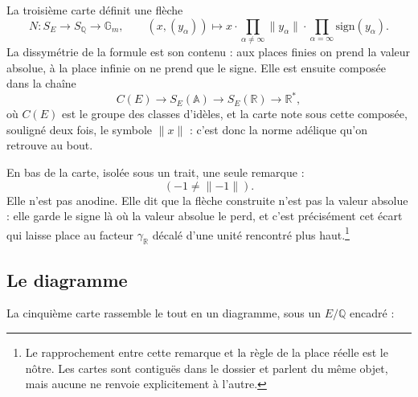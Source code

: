 \documentclass[11pt,a4paper]{article}
\begin{document}
La troisième carte définit une flèche
\[
N : S_{E} \longrightarrow S_{\mathbb{Q}} \longrightarrow \mathbb{G}_{m},
\qquad
(x, (y_{\alpha})) \longmapsto x \cdot \prod_{\alpha \neq \infty}
\lVert y_{\alpha}\rVert \cdot \prod_{\alpha = \infty}
\mathrm{sign}(y_{\alpha}) .
\]
La dissymétrie de la formule est son contenu : aux places finies on prend la
valeur absolue, à la place infinie on ne prend que le signe. Elle est ensuite
composée dans la chaîne
\[
C(E) \longrightarrow S_{E}(\mathbb{A}) \longrightarrow S_{E}(\mathbb{R})
\longrightarrow \mathbb{R}^{*},
\]
où $C(E)$ est le groupe des classes d'idèles, et la carte note sous cette
composée, souligné deux fois, le symbole $\lVert x\rVert$ : c'est donc la norme
adélique qu'on retrouve au bout.

En bas de la carte, isolée sous un trait, une seule remarque :
\[
(-1 \neq \lVert -1 \rVert).
\]
Elle n'est pas anodine. Elle dit que la flèche construite n'est pas la valeur
absolue : elle garde le signe là où la valeur absolue le perd, et c'est
précisément cet écart qui laisse place au facteur $\gamma_{\mathbb{R}}$ décalé
d'une unité rencontré plus haut.\footnote{Le rapprochement entre cette remarque
et la règle de la place réelle est le nôtre. Les cartes sont contiguës dans le
dossier et parlent du même objet, mais aucune ne renvoie explicitement à
l'autre.}

\subsection*{Le diagramme}

La cinquième carte rassemble le tout en un diagramme, sous un $E/\mathbb{Q}$
encadré :

\end{document}
